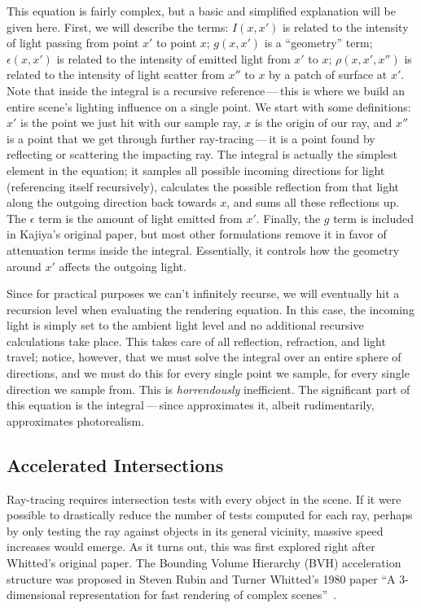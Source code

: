 This equation is fairly complex, but a basic and simplified explanation will be given here.
First, we will describe the terms: $I(x, x')$ is related to the intensity of light passing from point $x'$ to point $x$; $g(x, x')$ is a ``geometry'' term; $\epsilon(x, x')$ is related to the intensity of emitted light from $x'$ to $x$; $\rho(x, x',x'')$ is related to the intensity of light scatter from $x''$ to $x$ by a patch of surface at $x'$.
Note that inside the integral is a recursive reference\,---\,this is where we build an entire scene's lighting influence on a single point.
We start with some definitions: $x'$ is the point we just hit with our sample ray, $x$ is the origin of our ray, and $x''$ is a point that we get through further ray-tracing\,---\,it is a point found by reflecting or scattering the impacting ray.
The integral is actually the simplest element in the equation; it samples all possible incoming directions for light (referencing itself recursively), calculates the possible reflection from that light along the outgoing direction back towards $x$, and sums all these reflections up.
The $\epsilon$ term is the amount of light emitted from $x'$.
Finally, the $g$ term is included in Kajiya's original paper, but most other formulations remove it in favor of attenuation terms inside the integral.
Essentially, it controls how the geometry around $x'$ affects the outgoing light.

Since for practical purposes we can't infinitely recurse, we will eventually hit a recursion level when evaluating the rendering equation.
In this case, the incoming light is simply set to the ambient light level and no additional recursive calculations take place.
This takes care of all reflection, refraction, and light travel; notice, however, that we must solve the integral over an entire sphere of directions, and we must do this for every single point we sample, for every single direction we sample from.
This is {\it horrendously\/} inefficient.
The significant part of this equation is the integral\,---\,since \name{} approximates it, albeit rudimentarily, \name{} approximates photorealism.

\subsection{Accelerated Intersections}
\label{ch:relatedwork:discovery:acceleration}

Ray-tracing requires intersection tests with every object in the scene.
If it were possible to drastically reduce the number of tests computed for each ray, perhaps by only testing the ray against objects in its general vicinity, massive speed increases would emerge.
As it turns out, this was first explored right after Whitted's original paper.
The Bounding Volume Hierarchy (BVH) acceleration structure was proposed in Steven Rubin and Turner Whitted's 1980 paper ``A 3-dimensional representation for fast rendering of complex scenes''~\cite{rubin1980}.

